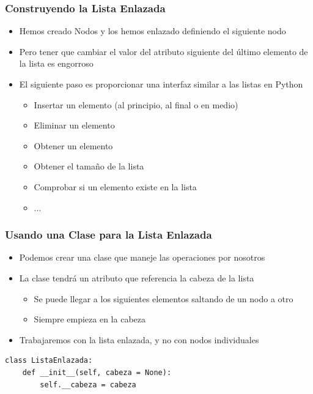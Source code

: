 \documentclass[11pt]{beamer}
\begin{document}
	\begin{frame}
		\frametitle{Construyendo la Lista Enlazada}
		\begin{itemize}
			\item Hemos creado Nodos y los hemos enlazado definiendo el siguiente nodo
			\item Pero tener que cambiar el valor del atributo siguiente del último elemento de la lista es engorroso
			\item El siguiente paso es proporcionar una interfaz similar a las listas en Python
			\begin{itemize}
				\item Insertar un elemento (al principio, al final o en medio)
				\item Eliminar un elemento
				\item Obtener un elemento
				\item Obtener el tamaño de la lista
				\item Comprobar si un elemento existe en la lista
				\item ...
			\end{itemize}
		\end{itemize}
		\vspace{0.7cm}
		\begin{center}
		\end{center}
	\end{frame}

	\begin{frame}[fragile]
		\frametitle{Usando una Clase para la Lista Enlazada}
		\begin{itemize}
		\item Podemos crear una clase que maneje las operaciones por nosotros
		\item La clase tendrá un atributo que referencia la cabeza de la lista
			\begin{itemize}
				\item Se puede llegar a los siguientes elementos saltando de un nodo a otro
				\item Siempre empieza en la cabeza
			\end{itemize}
		\item Trabajaremos con la lista enlazada, y no con nodos individuales
		\end{itemize}
\begin{lstlisting}
class ListaEnlazada:
	def __init__(self, cabeza = None):
		self.__cabeza = cabeza
\end{lstlisting}
	\end{frame}
\end{document}
